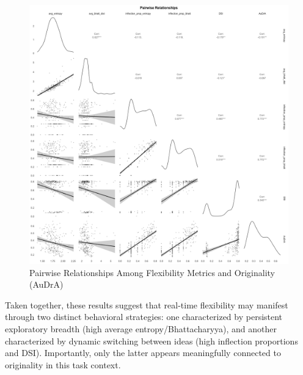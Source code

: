 \documentclass[../MA_Thesis.tex]{subfiles}
\begin{document}
\begin{figure}[H]
  \centering
  \includegraphics[width=\textwidth]{../analysis/results/main_results/correlation/ggpairs_flexibility_and_outcome.png}
  \caption{Pairwise Relationships Among Flexibility Metrics and Originality (AuDrA)}
  \label{fig:pairwise_flexibility_originality}
\end{figure}

Taken together, these results suggest that real-time flexibility may manifest through two distinct behavioral strategies: one characterized by persistent exploratory breadth (high average entropy/Bhattacharyya), and another characterized by dynamic switching between ideas (high inflection proportions and DSI). Importantly, only the latter appears meaningfully connected to originality in this task context.
\end{document}
